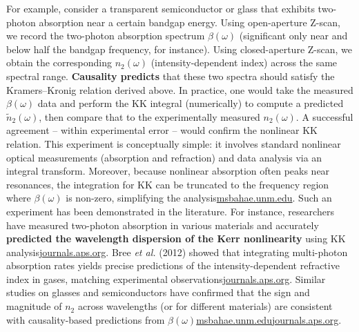 \documentclass[11pt,a4paper]{article}
\begin{document}
For example, consider a transparent semiconductor or glass that exhibits two-photon absorption near a certain bandgap energy. Using open-aperture Z-scan, we record the two-photon absorption spectrum $\beta(\omega)$ (significant only near and below half the bandgap frequency, for instance). Using closed-aperture Z-scan, we obtain the corresponding $n_2(\omega)$ (intensity-dependent index) across the same spectral range. \textbf{Causality predicts} that these two spectra should satisfy the Kramers–Kronig relation derived above. In practice, one would take the measured $\beta(\omega)$ data and perform the KK integral (numerically) to compute a predicted $\tilde{n}_2(\omega)$, then compare that to the experimentally measured $n_2(\omega)$. A successful agreement – within experimental error – would confirm the nonlinear KK relation. This experiment is conceptually simple: it involves standard nonlinear optical measurements (absorption and refraction) and data analysis via an integral transform. Moreover, because nonlinear absorption often peaks near resonances, the integration for KK can be truncated to the frequency region where $\beta(\omega)$ is non-zero, simplifying the analysis\href{https://msbahae.unm.edu/Courses/568%20Nonlinear%20Optics/OSA-Handbook%20of%20Optics-IV-Ch17.pdf#:~:text=data obtained in nonlinear optics,based on the linear absorption}{msbahae.unm.edu}. Such an experiment has been demonstrated in the literature. For instance, researchers have measured two-photon absorption in various materials and accurately \textbf{predicted the wavelength dispersion of the Kerr nonlinearity} using KK analysis\href{https://journals.aps.org/pra/abstract/10.1103/PhysRevA.85.033806#:~:text=As previous theoretical results recently,While shorter laser}{journals.aps.org}. Bree \emph{et al.} (2012) showed that integrating multi-photon absorption rates yields precise predictions of the intensity-dependent refractive index in gases, matching experimental observations\href{https://journals.aps.org/pra/abstract/10.1103/PhysRevA.85.033806#:~:text=As previous theoretical results recently,While shorter laser}{journals.aps.org}. Similar studies on glasses and semiconductors have confirmed that the sign and magnitude of $n_2$ across wavelengths (or for different materials) are consistent with causality-based predictions from $\beta(\omega)$\href{https://msbahae.unm.edu/Courses/568%20Nonlinear%20Optics/OSA-Handbook%20of%20Optics-IV-Ch17.pdf#:~:text=where ζ denotes the perturbation,constant as ωí is varied}{msbahae.unm.edu}\href{https://journals.aps.org/pra/abstract/10.1103/PhysRevA.85.033806#:~:text=As previous theoretical results recently,While shorter laser}{journals.aps.org}.
\end{document}
